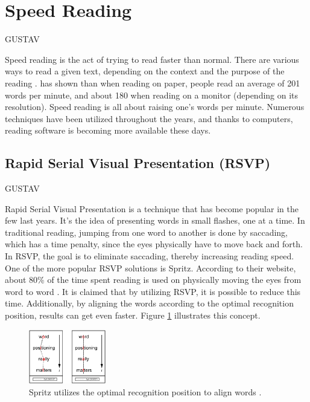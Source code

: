 \section{Speed Reading}
GUSTAV

Speed reading is the act of trying to read faster than normal. There are various ways to read a given text, depending on the context and the purpose of the reading \cite{differentWaysOfReading}.  has shown than when reading on paper, people read an average of 201 words per minute, and about 180 when reading on a monitor (depending on its resolution). Speed reading is all about raising one's words per minute. Numerous techniques have been utilized throughout the years, and  thanks to computers, reading software is becoming more available these days.


\subsection{Rapid Serial Visual Presentation (RSVP)}
GUSTAV

Rapid Serial Visual Presentation is a technique that has become popular in the few last years. It's the idea of presenting words in small flashes, one at a time. In traditional reading, jumping from one word to another is done by saccading, which has a time penalty, since the eyes physically have to move back and forth. In RSVP, the goal is to eliminate saccading, thereby increasing reading speed. One of the more popular RSVP solutions is Spritz. According to their website, about 80\% of the time spent reading is used on physically moving the eyes from word to word \cite{spritz}.	It is claimed that by utilizing RSVP, it is possible to reduce this time. Additionally, by aligning the words according to the optimal recognition position, results can get even faster. Figure \ref{fig:spritz_orp} illustrates this concept.

\begin{figure}[htbp]
\centering
\includegraphics[width=0.3\textwidth]{Pics/opr_spritz}
\caption{Spritz utilizes the optimal recognition position to align words \protect\cite{spritz}.}
\label{fig:spritz_orp}
\end{figure}

